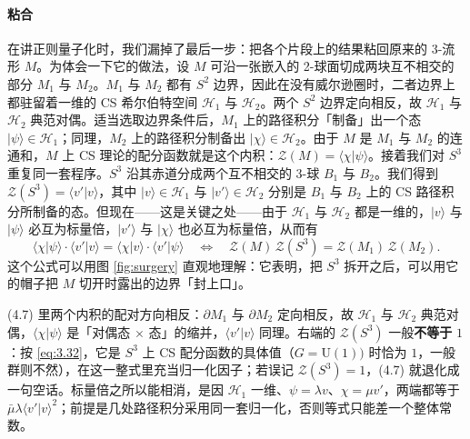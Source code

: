 \paragraph{粘合}
在讲正则量子化时，我们漏掉了最后一步：把各个片段上的结果粘回原来的 3-流形 $M$。为体会一下它的做法，设 $M$ 可沿一张嵌入的 2-球面切成两块互不相交的部分 $M_1$ 与 $M_2$。$M_1$ 与 $M_2$ 都有 $S^2$ 边界，因此在没有威尔逊圈时，二者边界上都驻留着一维的 CS 希尔伯特空间 $\mathcal{H}_1$ 与 $\mathcal{H}_2$。两个 $S^2$ 边界定向相反，故 $\mathcal{H}_1$ 与 $\mathcal{H}_2$ 典范对偶。适当选取边界条件后，$M_1$ 上的路径积分「制备」出一个态 $|\psi\rangle\in\mathcal{H}_1$；同理，$M_2$ 上的路径积分制备出 $|\chi\rangle\in\mathcal{H}_2$。由于 $M$ 是 $M_1$ 与 $M_2$ 的连通和，$M$ 上 CS 理论的配分函数就是这个内积：$\mathcal{Z}(M)=\langle\chi|\psi\rangle$。接着我们对 $S^3$ 重复同一套程序。$S^3$ 沿其赤道分成两个互不相交的 3-球 $B_1$ 与 $B_2$。我们得到 $\mathcal{Z}(S^3)=\langle v'|v\rangle$，其中 $|v\rangle\in\mathcal{H}_1$ 与 $|v'\rangle\in\mathcal{H}_2$ 分别是 $B_1$ 与 $B_2$ 上的 CS 路径积分所制备的态。但现在——这是关键之处——由于 $\mathcal{H}_1$ 与 $\mathcal{H}_2$ 都是一维的，$|v\rangle$ 与 $|\psi\rangle$ 必互为标量倍，$|v'\rangle$ 与 $|\chi\rangle$ 也必互为标量倍，从而有
\begin{equation}\tag{4.7}\label{eq:4.7}
  \langle\chi|\psi\rangle\cdot\langle v'|v\rangle = \langle\chi|v\rangle\cdot\langle v'|\psi\rangle
  \quad\Longleftrightarrow\quad
  \mathcal{Z}(M)\,\mathcal{Z}(S^3) = \mathcal{Z}(M_1)\,\mathcal{Z}(M_2).
\end{equation}
这个公式可以用图 \ref{fig:surgery} 直观地理解：它表明，把 $S^3$ 拆开之后，可以用它的帽子把 $M$ 切开时露出的边界「封上口」。

\begin{yizhu}[易错点]
(4.7) 里两个内积的配对方向相反：$\partial M_1$ 与 $\partial M_2$ 定向相反，故 $\mathcal{H}_1$ 与 $\mathcal{H}_2$ 典范对偶，$\langle\chi|\psi\rangle$ 是「对偶态 $\times$ 态」的缩并，$\langle v'|v\rangle$ 同理。右端的 $\mathcal{Z}(S^3)$ 一般\textbf{不等于} $1$：按 \eqref{eq:3.32}，它是 $S^3$ 上 CS 配分函数的具体值（$G=\mathrm{U}(1))$ 时恰为 $1$，一般群则不然），在这一整式里充当归一化因子；若误记 $\mathcal{Z}(S^3)=1$，(4.7) 就退化成一句空话。标量倍之所以能相消，是因 $\mathcal{H}_1$ 一维、$\psi=\lambda v$、$\chi=\mu v'$，两端都等于 $\bar\mu\lambda\langle v'|v\rangle^{2}$；前提是几处路径积分采用同一套归一化，否则等式只能差一个整体常数。
\end{yizhu}

